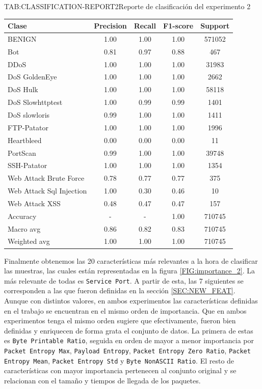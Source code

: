 \begin{table}{TAB:CLASSIFICATION-REPORT2}{Reporte de clasificación del experimento 2}
\centering
\scriptsize
\begin{tabular}{p{4.6cm}cccc}
\hline
Clase & Precision & Recall & F1-score & Support \\
\hline
BENIGN & 1.00 & 1.00 & 1.00 & 571052 \\
Bot & 0.81 & 0.97 & 0.88 & 467 \\
DDoS & 1.00 & 1.00 & 1.00 & 31983 \\
DoS GoldenEye & 1.00 & 1.00 & 1.00 & 2662 \\
DoS Hulk & 1.00 & 1.00 & 1.00 & 58118 \\
DoS Slowhttptest & 1.00 & 0.99 & 0.99 & 1401 \\
DoS slowloris & 0.99 & 1.00 & 1.00 & 1411 \\
FTP-Patator & 1.00 & 1.00 & 1.00 & 1996 \\
Heartbleed & 0.00 & 0.00 & 0.00 & 11 \\
PortScan & 0.99 & 1.00 & 1.00 & 39748 \\
SSH-Patator & 1.00 & 1.00 & 1.00 & 1354 \\
Web Attack Brute Force & 0.78 & 0.77 & 0.77 & 375 \\
Web Attack Sql Injection & 1.00 & 0.30 & 0.46 & 10 \\
Web Attack XSS & 0.48 & 0.47 & 0.47 & 157 \\
\hline
Accuracy & - & - & 1.00 & 710745 \\
Macro avg & 0.86 & 0.82 & 0.83 & 710745 \\
Weighted avg & 1.00 & 1.00 & 1.00 & 710745 \\
\hline
\end{tabular}
\end{table}

Finalmente obtenemos las 20 características más relevantes a la hora de clasificar las muestras, las cuales están representadas en la figura \ref{FIG:importance_2}. La más relevante de todas es \texttt{Service Port}. A partir de esta, las 7 siguientes se corresponden a las que fueron definidas en la sección \ref{SEC:NEW_FEAT}. Aunque con distintos valores, en ambos experimentos las características definidas en el trabajo se encuentran en el mismo orden de importancia. Que en ambos experimentos tenga el mismo orden sugiere que efectivamente, fueron bien definidas y enriquecen de forma grata el conjunto de datos. La primera de estas es \texttt{Byte Printable Ratio}, seguida en orden de mayor a menor importancia por \texttt{Packet Entropy Max}, \texttt{Payload Entropy}, \texttt{Packet Entropy Zero Ratio}, \texttt{Packet Entropy Mean}, \texttt{Packet Entropy Std} y \texttt{Byte NonASCII Ratio}. El resto de características con mayor importancia pertenecen al conjunto original y se relacionan con el tamaño y tiempos de llegada de los paquetes. 

